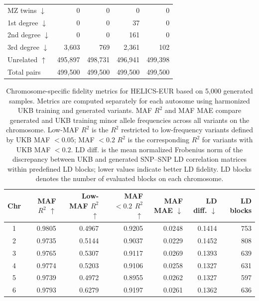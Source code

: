 \documentclass{article}
\begin{document}
\begin{table}[h]
\begin{tabular}{lrrrr}
\midrule
MZ twins \(\downarrow\)      & 0 & 0 & 0 & 0 \\
1st degree \(\downarrow\)    & 0 & 0 & 37 & 0 \\
2nd degree \(\downarrow\)    & 0 & 0 & 161 & 0 \\
3rd degree \(\downarrow\)    & 3{,}603 & 769 & 2{,}361 & 102 \\
Unrelated \(\uparrow\)       & 495{,}897 & 498{,}731 & 496{,}941 & 499{,}398 \\
Total pairs                  & 499{,}500 & 499{,}500 & 499{,}500 & 499{,}500 \\
\bottomrule
\end{tabular}
\end{table}


\begin{table}[t]
\centering
\caption{
Chromosome-specific fidelity metrics for HELICS-EUR based on 5{,}000 generated samples. Metrics are computed separately for each autosome using harmonized UKB training and generated variants. MAF \(R^2\) and MAF MAE compare generated and UKB training minor allele frequencies across all variants on the chromosome. Low-MAF \(R^2\) is the \(R^2\) restricted to low-frequency variants defined by UKB MAF \(<0.05\); MAF \(<0.2\) \(R^2\) is the corresponding \(R^2\) for variants with UKB MAF \(<0.2\). LD diff. is the mean normalized Frobenius norm of the discrepancy between UKB and generated SNP--SNP LD correlation matrices within predefined LD blocks; lower values indicate better LD fidelity. LD blocks denotes the number of evaluated blocks on each chromosome.
}
\label{tab:chromosome_specific_fidelity_helics_eur}
\small
\setlength{\tabcolsep}{4pt}
\renewcommand{\arraystretch}{0.95}
\begin{tabular}{c r r r r r r}
\toprule
\textbf{Chr}
& \textbf{MAF \(R^2\) \(\uparrow\)}
& \textbf{Low-MAF \(R^2\) \(\uparrow\)}
& \textbf{MAF \(<0.2\) \(R^2\) \(\uparrow\)}
& \textbf{MAF MAE \(\downarrow\)}
& \textbf{LD diff. \(\downarrow\)}
& \textbf{LD blocks} \\
\midrule
1  & 0.9805 & 0.4967 & 0.9205 & 0.0248 & 0.1414 & 753 \\
2  & 0.9735 & 0.5144 & 0.9037 & 0.0229 & 0.1452 & 808 \\
3  & 0.9765 & 0.5307 & 0.9117 & 0.0269 & 0.1393 & 639 \\
4  & 0.9774 & 0.5203 & 0.9106 & 0.0258 & 0.1327 & 631 \\
5  & 0.9739 & 0.4972 & 0.8955 & 0.0262 & 0.1327 & 597 \\
6  & 0.9793 & 0.6279 & 0.9197 & 0.0261 & 0.1362 & 636 \\

\end{tabular}
\end{table}
\end{document}
